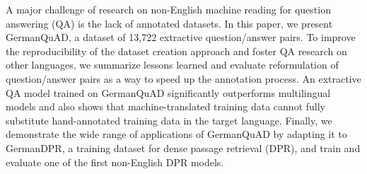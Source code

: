 A major challenge of research on non-English machine reading for question answering (QA) is the lack of annotated datasets. In this paper, we present GermanQuAD, a dataset of 13,722 extractive question/answer pairs. To improve the reproducibility of the dataset creation approach and foster QA research on other languages, we summarize lessons learned and evaluate reformulation of question/answer pairs as a way to speed up the annotation process. An extractive QA model trained on GermanQuAD significantly outperforms multilingual models and also shows that machine-translated training data cannot fully substitute hand-annotated training data in the target language. Finally, we demonstrate the wide range of applications of GermanQuAD by adapting it to GermanDPR, a training dataset for dense passage retrieval (DPR), and train and evaluate one of the first non-English DPR models.
